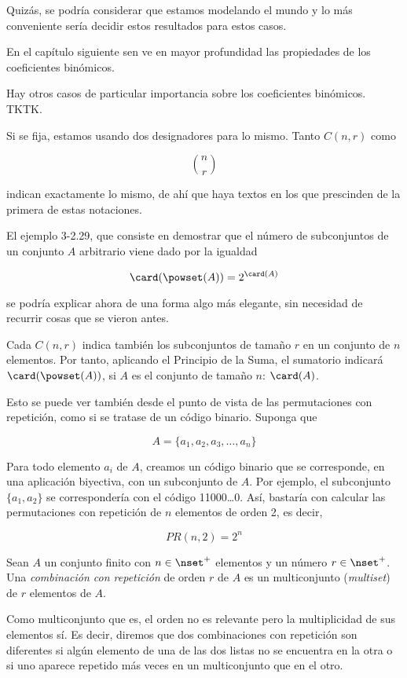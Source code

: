 Quizás, se podría considerar que estamos modelando el mundo y lo más
conveniente sería decidir estos resultados para estos casos.

En el capítulo siguiente sen ve en mayor profundidad las propiedades de los
coeficientes binómicos.




Hay otros casos de particular importancia sobre los coeficientes binómicos.
TKTK.

Si se fija, estamos usando dos designadores para lo mismo. Tanto $C(n, r)$
como

$$ {n \choose r} $$

\noindent indican exactamente lo mismo, de ahí que haya textos en los que
prescinden de la primera de estas notaciones.

El ejemplo 3-2.29, que consiste en demostrar que el número de subconjuntos
de un conjunto $A$ arbitrario viene dado por la igualdad

$$ \card(\powset(A)) = 2^{\card(A)} $$

\noindent se podría explicar ahora de una forma algo más elegante, sin
necesidad de recurrir cosas que se vieron antes.

Cada $C(n, r)$ indica también los subconjuntos de tamaño $r$ en un conjunto
de $n$ elementos. Por tanto, aplicando el Principio de la Suma, el sumatorio
indicará $\card(\powset(A))$, si $A$ es el conjunto de tamaño $n$:
$\card(A)$.

Esto se puede ver también desde el punto de vista de las permutaciones con
repetición, como si se tratase de un código binario. Suponga que

$$ A = \{a_1, a_2, a_3, \ldots, a_n\} $$

Para todo elemento $a_i$ de $A$, creamos un código binario que se
corresponde, en una aplicación biyectiva, con un subconjunto de $A$. Por
ejemplo, el subconjunto $\{a_1, a_2\}$ se correspondería con el código
11000\ldots 0. Así, bastaría con calcular las permutaciones con repetición
de $n$ elementos de orden 2, es decir,

$$ PR(n, 2) = 2^n $$

\begin{deffinition}
  Sean $A$ un conjunto finito con $n \in \nset^{+}$ elementos y un número $r
  \in \nset^{+}$. Una \emph{combinación con repetición} de orden $r$ de $A$ es
  un multiconjunto (\emph{multiset}) de $r$ elementos de $A$.

  Como multiconjunto que es, el orden no es relevante pero la multiplicidad
  de sus elementos sí. Es decir, diremos que dos combinaciones con
  repetición son diferentes si algún elemento de una de las dos listas no se
  encuentra en la otra o si uno aparece repetido más veces en un
  multiconjunto que en el otro.
\end{deffinition}

